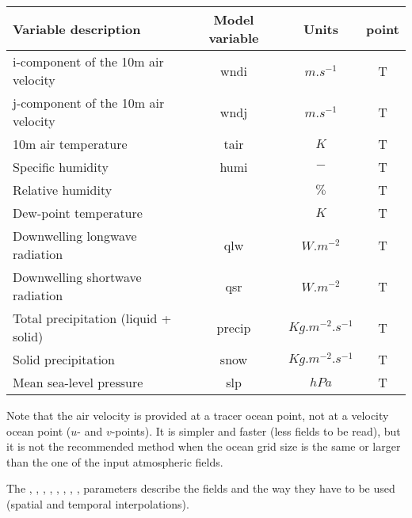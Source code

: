 \documentclass[../main/NEMO_manual]{subfiles}
\begin{document}
\begin{table}[htbp]
  \centering
  \begin{tabular}{|l|c|c|c|}
    \hline
    Variable description                 & Model variable & Units              & point \\
    \hline
    i-component of the 10m air velocity  & wndi           & $m.s^{-1}$         & T     \\
    \hline
    j-component of the 10m air velocity  & wndj           & $m.s^{-1}$         & T     \\
    \hline
    10m air temperature                  & tair           & $K$               & T     \\
    \hline
    Specific humidity                    & humi           & $-$               & T     \\
    Relative humidity                    & ~              & $\%$              & T     \\
    Dew-point temperature                & ~              & $K$               & T     \\    
    \hline
    Downwelling longwave radiation       & qlw            & $W.m^{-2}$         & T     \\
    \hline
    Downwelling shortwave radiation      & qsr            & $W.m^{-2}$         & T     \\
    \hline
    Total precipitation (liquid + solid) & precip         & $Kg.m^{-2}.s^{-1}$ & T     \\
    \hline
    Solid precipitation                  & snow           & $Kg.m^{-2}.s^{-1}$ & T     \\
    \hline
    Mean sea-level pressure              & slp            & $hPa$              & T     \\
    \hline
    \end{tabular}
  \label{tab:SBC_BULK}
\end{table}

Note that the air velocity is provided at a tracer ocean point, not at a velocity ocean point ($u$- and $v$-points).
It is simpler and faster (less fields to be read), but it is not the recommended method when
the ocean grid size is the same or larger than the one of the input atmospheric fields.

The , , , , , , ,
,  parameters describe the fields and the way they have to be used
(spatial and temporal interpolations).
\end{document}
